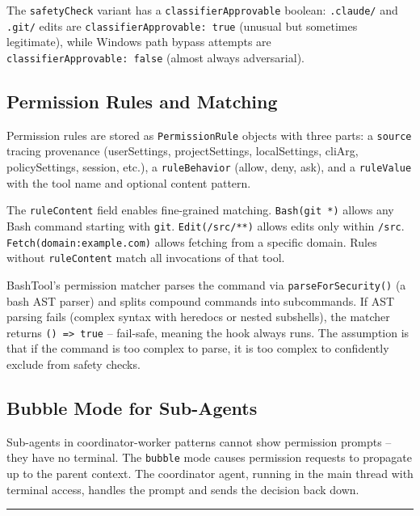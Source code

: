 \documentclass[
  english,
  11pt,
  letterpaper,
]{book}
\begin{document}
The \texttt{safetyCheck} variant has a \texttt{classifierApprovable}
boolean: \texttt{.claude/} and \texttt{.git/} edits are
\texttt{classifierApprovable:\ true} (unusual but sometimes legitimate),
while Windows path bypass attempts are
\texttt{classifierApprovable:\ false} (almost always adversarial).

\subsection{Permission Rules and
Matching}\label{permission-rules-and-matching}

Permission rules are stored as \texttt{PermissionRule} objects with
three parts: a \texttt{source} tracing provenance (userSettings,
projectSettings, localSettings, cliArg, policySettings, session, etc.),
a \texttt{ruleBehavior} (allow, deny, ask), and a \texttt{ruleValue}
with the tool name and optional content pattern.

The \texttt{ruleContent} field enables fine-grained matching.
\texttt{Bash(git\ *)} allows any Bash command starting with
\texttt{git}. \texttt{Edit(/src/**)} allows edits only within
\texttt{/src}. \texttt{Fetch(domain:example.com)} allows fetching from a
specific domain. Rules without \texttt{ruleContent} match all
invocations of that tool.

BashTool's permission matcher parses the command via
\texttt{parseForSecurity()} (a bash AST parser) and splits compound
commands into subcommands. If AST parsing fails (complex syntax with
heredocs or nested subshells), the matcher returns
\texttt{()\ =\textgreater{}\ true} -- fail-safe, meaning the hook always
runs. The assumption is that if the command is too complex to parse, it
is too complex to confidently exclude from safety checks.

\subsection{Bubble Mode for
Sub-Agents}\label{bubble-mode-for-sub-agents}

Sub-agents in coordinator-worker patterns cannot show permission prompts
-- they have no terminal. The \texttt{bubble} mode causes permission
requests to propagate up to the parent context. The coordinator agent,
running in the main thread with terminal access, handles the prompt and
sends the decision back down.

\begin{center}\rule{0.5\linewidth}{0.5pt}\end{center}
\end{document}
